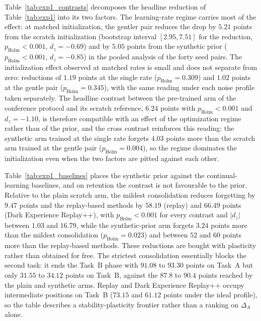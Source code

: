 \documentclass[preprint,number,sort&compress]{elsarticle}
\begin{document}
Table~\ref{tab:exp1_contrasts} decomposes the headline reduction of
Table~\ref{tab:exp1} into its two factors. The learning-rate regime
carries most of the effect: at matched initialization, the gentler pair
reduces the drop by $5.21$ points from the scratch initialization
(bootstrap interval $[2.95, 7.51]$ for the reduction,
$p_{\text{Holm}} < 0.001$, $d_z = -0.69$) and by $5.05$ points from the
synthetic prior ($p_{\text{Holm}} < 0.001$, $d_z = -0.85$) in the pooled
analysis of the forty seed pairs. The initialization effect observed at
matched rates is small and does not separate from zero: reductions of
$1.19$ points at the single rate ($p_{\text{Holm}} = 0.309$) and $1.02$
points at the gentle pair ($p_{\text{Holm}} = 0.345$), with the same
reading under each noise profile taken separately. The headline
contrast between the pre-trained arm of the conference protocol and its
scratch reference, $6.24$ points with $p_{\text{Holm}} < 0.001$ and
$d_z = -1.10$, is therefore compatible with an effect of the
optimization regime rather than of the prior, and the cross contrast
reinforces this reading: the synthetic arm trained at the single rate
forgets $4.03$ points more than the scratch arm trained at the gentle
pair ($p_{\text{Holm}} = 0.004$), so the regime dominates the
initialization even when the two factors are pitted against each other.

Table~\ref{tab:exp1_baselines} places the synthetic prior against the
continual-learning baselines, and on retention the contrast is not
favourable to the prior. Relative to the plain scratch arm, the mildest
consolidation reduces forgetting by $9.47$ points and the replay-based
methods by $58.19$ (replay) and $66.49$ points (Dark Experience
Replay++), with $p_{\text{Holm}} < 0.001$ for every contrast and
$|d_z|$ between $1.03$ and $16.79$, while the synthetic-prior arm
forgets $3.24$ points more than the mildest consolidation
($p_{\text{Holm}} = 0.023$) and between $52$ and $60$ points more than
the replay-based methods. These reductions are bought with plasticity
rather than obtained for free. The strictest consolidation essentially
blocks the second task: it ends the Task~B phase with $91.08$ to $93.30$
points on Task~A but only $31.55$ to $34.12$ points on Task~B, against
the $87.8$ to $90.4$ points reached by the plain and synthetic arms.
Replay and Dark Experience Replay++ occupy intermediate positions on
Task~B ($73.15$ and $61.12$ points under the ideal profile), so the
table describes a stability-plasticity frontier rather than a ranking
on $\Delta_A$ alone.
\end{document}
